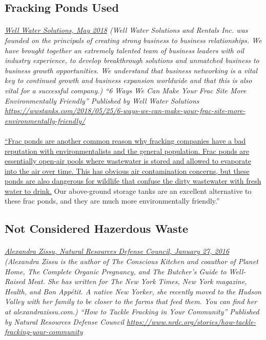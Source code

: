 \documentclass{article}
\begin{document}
\subsection{Fracking Ponds Used}
\paragraph{}
\small
\textit{
\underline{Well Water Solutions, May 2018}
  (Well Water Solutions and Rentals Inc. was founded on the principals of creating strong business to business relationships. We have brought together an extremely talented team of business leaders with oil industry experience, to develop breakthrough solutions and unmatched business to business growth opportunities. We understand that business networking is a vital key to continued growth and business expansion worldwide and that this is also vital for a successful company.) “6 Ways We Can Make Your Frac Site More Environmentally Friendly” Published by Well Water Solutions  \url{https://wwstanks.com/2018/05/25/6-ways-we-can-make-your-frac-site-more-environmentally-friendly/ }}
\normalsize
\paragraph{}
\ul{``Frac ponds are another common reason why fracking companies have a bad reputation with environmentalists and the general population. Frac ponds are essentially open-air pools where wastewater is stored and allowed to evaporate into the air over time. This has obvious air contamination concerns, but these ponds are also dangerous for wildlife that confuse the dirty wastewater with fresh water to drink.} Our above-ground storage tanks are an excellent alternative to these frac ponds, and they are much more environmentally friendly.”

\subsection{Not Considered Hazerdous Waste}
\paragraph{}
\small
\textit{
\underline{Alexandra Zissu, Natural Resources Defense Council, January 27, 2016}
(Alexandra Zissu is the author of The Conscious Kitchen and coauthor of Planet Home, The Complete Organic Pregnancy, and The Butcher's Guide to Well-Raised Meat. She has written for The New York Times, New York magazine, Health, and Bon Appétit. A native New Yorker, she recently moved to the Hudson Valley with her family to be closer to the farms that feed them. You can find her at alexandrazissu.com.) “How to Tackle Fracking in Your Community” Published by Natural Resources Defense Council  \url{https://www.nrdc.org/stories/how-tackle-fracking-your-community}}
\normalsize
\end{document}
